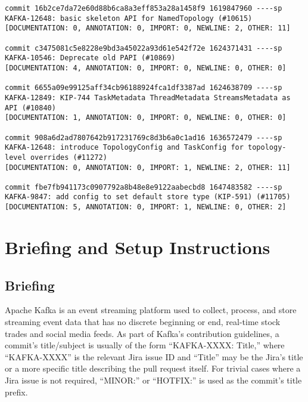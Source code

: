 \begin{lstlisting}
commit 16b2ce7da72e60d88b6ca8a3eff853a28a1458f9 1619847960 ----sp
KAFKA-12648: basic skeleton API for NamedTopology (#10615)                                          
[DOCUMENTATION: 0, ANNOTATION: 0, IMPORT: 0, NEWLINE: 2, OTHER: 11]

commit c3475081c5e8228e9bd3a45022a93d61e542f72e 1624371431 ----sp
KAFKA-10546: Deprecate old PAPI (#10869)                                                            
[DOCUMENTATION: 4, ANNOTATION: 0, IMPORT: 0, NEWLINE: 0, OTHER: 0]

commit 6655a09e99125aff34cb96188924fca1df3387ad 1624638709 ----sp
KAFKA-12849: KIP-744 TaskMetadata ThreadMetadata StreamsMetadata as API (#10840)                    
[DOCUMENTATION: 1, ANNOTATION: 0, IMPORT: 0, NEWLINE: 0, OTHER: 0]

commit 908a6d2ad7807642b917231769c8d3b6a0c1ad16 1636572479 ----sp
KAFKA-12648: introduce TopologyConfig and TaskConfig for topology-level overrides (#11272)          
[DOCUMENTATION: 0, ANNOTATION: 0, IMPORT: 1, NEWLINE: 2, OTHER: 11]

commit fbe7fb941173c0907792a8b48e8e9122aabecbd8 1647483582 ----sp
KAFKA-9847: add config to set default store type (KIP-591) (#11705)                                 
[DOCUMENTATION: 5, ANNOTATION: 0, IMPORT: 1, NEWLINE: 0, OTHER: 2]
\end{lstlisting}


\section{Briefing and Setup Instructions}
\label{sec:Briefing-and-Setup}

\subsection{Briefing}
\label{subsec:Briefing}

Apache Kafka is an event streaming platform used to collect, process, and store streaming event data that has no discrete beginning or end, \eg real-time stock trades and social media feeds. 
As part of Kafka’s contribution guidelines, a commit’s title/subject is usually of the form ``KAFKA-XXXX: Title,'' where ``KAFKA-XXXX'' is the relevant Jira issue ID and ``Title'' may be the Jira’s title or a more specific title describing the pull request itself. 
For trivial cases where a Jira issue is not required, ``MINOR:'' or ``HOTFIX:'' is used as the commit’s title prefix.


